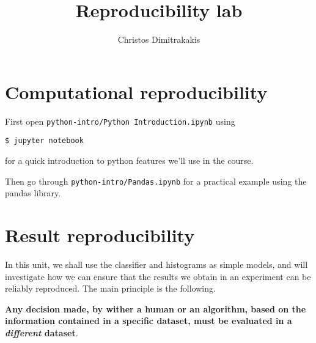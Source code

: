 \documentclass[a4paper,twoside]{article}
\title{Reproducibility lab}
\author[C. Dimitrakakis]{Christos Dimitrakakis}
\begin{document}
\maketitle
\tableofcontents

\section{Computational reproducibility}

First open \texttt{python-intro/Python Introduction.ipynb} using
\begin{verbatim}
$ jupyter notebook
\end{verbatim}
for a quick introduction to python features we'll use in the course.

Then go through \texttt{python-intro/Pandas.ipynb} for a practical example using the pandas library.


\section{Result reproducibility}
In this unit, we shall use the \KNN{} classifier and histograms as simple models, and will investigate how we can ensure that the results we obtain in an experiment can be reliably reproduced. The main principle is the following.

\textbf{Any decision made, by wither a human or an algorithm, based on the information contained in a specific dataset, must be evaluated in a \emph{different} dataset}.
\end{document}
